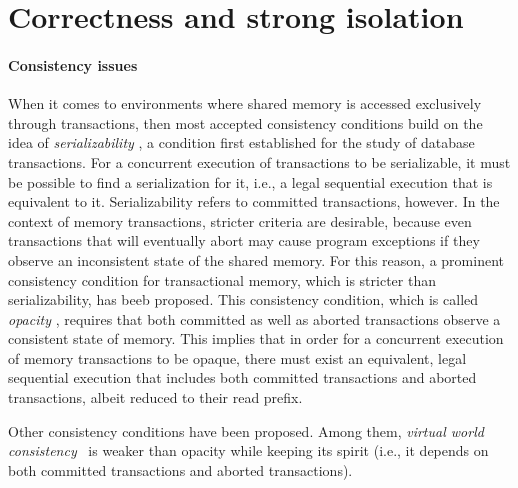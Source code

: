 \documentclass[11pt,letterpaper]{article}
\begin{document}
\section{Correctness and strong isolation}
\label{sec:badthings}

\paragraph{Consistency issues}
When it comes  to environments where shared memory  is accessed exclusively
through transactions, then most accepted  
consistency   conditions    build   on   the idea of   {\it serializability}
\cite{P79}, a condition first  
established  for  the study  of  database  transactions.  For a  concurrent
execution of transactions to be serializable, it must be  
possible to find a serialization for it, i.e., a legal sequential execution
that is equivalent to it.  Serializability refers to committed  
transactions,  however. In  the  context of  memory transactions,  stricter
criteria are desirable, because even transactions that  
will  eventually abort  may cause  program  exceptions if  they observe  an
inconsistent state of the shared memory.  For this  
reason, a  prominent consistency condition for  transactional memory, which
is stricter than serializability,  has beeb proposed. 
This  consistency condition, which is called {\it opacity}
\cite{guerraoui08},  requires   that  both
committed as well as aborted transactions  
observe a  consistent state  of memory.  This implies that  in order  for a
concurrent execution of memory transactions to be  
opaque,  there must exist  an equivalent,  legal sequential  execution that
includes both committed transactions and aborted  
transactions, albeit reduced to their read prefix.

Other consistency conditions have been proposed. Among them, 
{\it virtual world consistency}~\cite{IR09} is weaker than 
opacity while keeping its spirit (i.e., it depends on both committed 
transactions and aborted transactions). 
\end{document}
